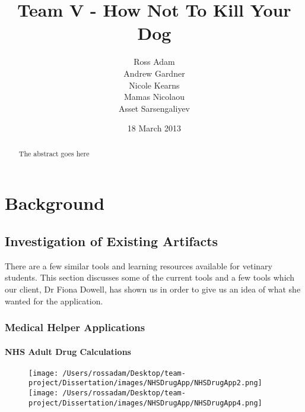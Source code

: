 \documentclass{l3proj}
\begin{document}
\title{Team V - How Not To Kill Your Dog}
\author{Ross Adam \\
        Andrew Gardner \\
        Nicole Kearns \\
        Mamas Nicolaou \\
        Asset Sarsengaliyev}
\date{18 March 2013}
\maketitle
\begin{abstract}

The abstract goes here

\end{abstract}
\educationalconsent
\tableofcontents

\chapter{Background}
\label{background}

\section{Investigation of Existing Artifacts}


There are a few similar tools and learning resources available for vetinary students. This section discusses some of the current tools and a few tools which our client, Dr Fiona Dowell, has shown us in order to give us an idea of what she wanted for the application.

\subsection{Medical Helper Applications}


\subsubsection{NHS Adult Drug Calculations}

\begin{figure}[!htb]
  \texttt{[image: /Users/rossadam/Desktop/team-project/Dissertation/images/NHSDrugApp/NHSDrugApp2.png]}
\endminipage\hfill
{}
  \texttt{[image: /Users/rossadam/Desktop/team-project/Dissertation/images/NHSDrugApp/NHSDrugApp4.png]}
\endminipage
\end{figure}
\end{document}
